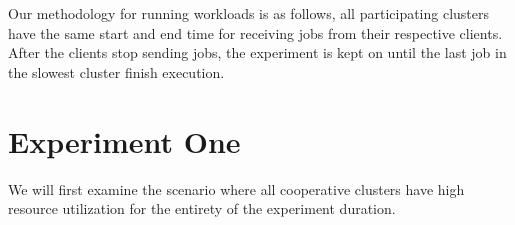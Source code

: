 Our methodology for running workloads is as follows, all participating clusters
have the same start and end time for receiving jobs from their respective
clients. After the clients stop sending jobs, the experiment is kept on until
the last job in the slowest cluster finish execution. 

\section{Experiment One}

\begin{center}
\end{center}
We will first examine the scenario where all cooperative clusters have high
resource utilization for the entirety of the experiment duration.


